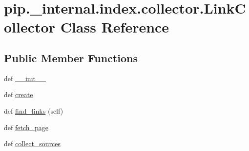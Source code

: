\hypertarget{classpip_1_1__internal_1_1index_1_1collector_1_1LinkCollector}{}\section{pip.\+\_\+internal.\+index.\+collector.\+Link\+Collector Class Reference}
\label{classpip_1_1__internal_1_1index_1_1collector_1_1LinkCollector}
\subsection*{Public Member Functions}
\begin{DoxyCompactItemize}
\item 
def \hyperlink{classpip_1_1__internal_1_1index_1_1collector_1_1LinkCollector_ab22f57d07a0d383cc28a165cbcfde8da}{\+\_\+\+\_\+init\+\_\+\+\_\+}
\item 
def \hyperlink{classpip_1_1__internal_1_1index_1_1collector_1_1LinkCollector_a4fca6661883258f393b69de85feb4d90}{create}
\item 
def \hyperlink{classpip_1_1__internal_1_1index_1_1collector_1_1LinkCollector_a20a332f936cb9aa4fb7419f2d03fde4d}{find\+\_\+links} (self)
\item 
def \hyperlink{classpip_1_1__internal_1_1index_1_1collector_1_1LinkCollector_a4c15cff856ab9c71edeab84596327922}{fetch\+\_\+page}
\item 
def \hyperlink{classpip_1_1__internal_1_1index_1_1collector_1_1LinkCollector_af657c7fc23a0dfd8308b6592ed74e96e}{collect\+\_\+sources}
\end{DoxyCompactItemize}
